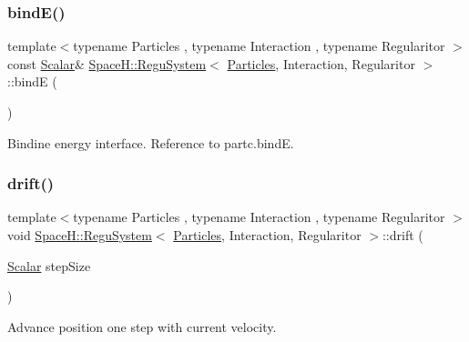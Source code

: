 \subsubsection{\texorpdfstring{bind\+E()}{bindE()}}
{\footnotesize\ttfamily template$<$typename Particles , typename Interaction , typename Regularitor $>$ \\
const \mbox{\hyperlink{class_space_h_1_1_regu_system_a6f6c4d4fd030a85621a78b137c0ac889}{Scalar}}\& \mbox{\hyperlink{class_space_h_1_1_regu_system}{Space\+H\+::\+Regu\+System}}$<$ \mbox{\hyperlink{struct_space_h_1_1_particles}{Particles}}, Interaction, Regularitor $>$\+::bindE (\begin{DoxyParamCaption}{ }\end{DoxyParamCaption})\hspace{0.3cm}{\ttfamily [inline]}}



Bindine energy interface. Reference to partc.\+bindE. 

\mbox{\label{class_space_h_1_1_regu_system_a96230f1b7cda19c0605e1148252ec7ae}} 
\subsubsection{\texorpdfstring{drift()}{drift()}}
{\footnotesize\ttfamily template$<$typename Particles , typename Interaction , typename Regularitor $>$ \\
void \mbox{\hyperlink{class_space_h_1_1_regu_system}{Space\+H\+::\+Regu\+System}}$<$ \mbox{\hyperlink{struct_space_h_1_1_particles}{Particles}}, Interaction, Regularitor $>$\+::drift (\begin{DoxyParamCaption}\item[{\mbox{\hyperlink{class_space_h_1_1_regu_system_a6f6c4d4fd030a85621a78b137c0ac889}{Scalar}}}]{step\+Size }\end{DoxyParamCaption})\hspace{0.3cm}{\ttfamily [inline]}}



Advance position one step with current velocity. 

